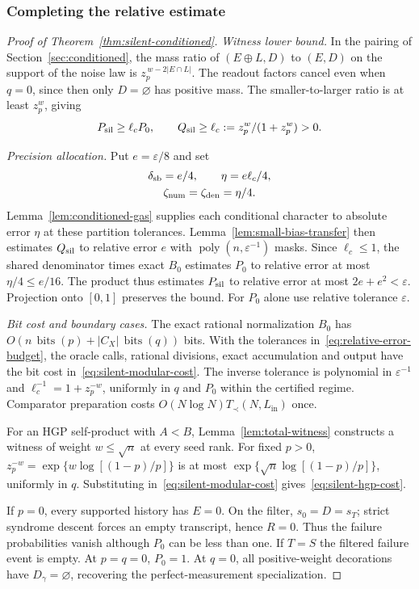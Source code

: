 \documentclass[10pt,twocolumn]{article}
\theoremstyle{definition}
\DeclareMathOperator{\poly}{poly}
\newcommand{\Lin}{L_{\mathrm{in}}}
\newcommand{\Tprec}{T_{\prec}}
\begin{document}
\subsubsection{Completing the relative estimate}\label{sec:main-proof}
\begin{proof}[Proof of Theorem~\ref{thm:silent-conditioned}]
\emph{Witness lower bound.} In the pairing of Section~\ref{sec:conditioned},
the mass ratio of $(E\oplus L,D)$ to $(E,D)$ on the support of the
noise law is $z_p^{\,w-2|E\cap L|}$. The readout factors cancel even
when $q=0$, since then only $D=\varnothing$ has positive mass.
The smaller-to-larger ratio is at least $z_p^w$, giving
\begin{equation}\label{eq:conditional-witness}
 P_{\rm sil}\ge\ell_c P_0,\qquad
 Q_{\rm sil}\ge\ell_c:=z_p^w/(1+z_p^w)>0.
\end{equation}

\emph{Precision allocation.} Put $e=\varepsilon/8$ and set
\begin{equation}\label{eq:relative-error-budget}
\begin{gathered}
 \delta_{\rm sb}=e/4,\qquad \eta=e\ell_c/4,\\
 \zeta_{\rm num}=\zeta_{\rm den}=\eta/4 .
\end{gathered}
\end{equation}
Lemma~\ref{lem:conditioned-gas} supplies each conditional character to
absolute error $\eta$ at these partition tolerances.
Lemma~\ref{lem:small-bias-transfer} then estimates $Q_{\rm sil}$ to
relative error $e$ with $\poly(n,\varepsilon^{-1})$ masks.
Since $\ell_c\le1$, the shared denominator times exact $B_0$ estimates
$P_0$ to relative error at most $\eta/4\le e/16$. The product thus
estimates $P_{\rm sil}$ to relative error at most $2e+e^2<\varepsilon$.
Projection onto $[0,1]$ preserves the bound.
For $P_0$ alone use relative tolerance $\varepsilon$.

\emph{Bit cost and boundary cases.} The exact rational normalization
$B_0$ has $O(n\,\operatorname{bits}(p)+|C_X|\,\operatorname{bits}(q))$
bits.
With the tolerances in~\eqref{eq:relative-error-budget}, the oracle
calls, rational divisions, exact accumulation and output have the bit
cost in~\eqref{eq:silent-modular-cost}. The inverse tolerance is
polynomial in $\varepsilon^{-1}$ and $\ell_c^{-1}=1+z_p^{-w}$,
uniformly in $q$ and $P_0$ within the certified regime.
Comparator preparation costs
$O(N\log N)\Tprec(N,\Lin)$ once.

For an HGP self-product with $A<B$, Lemma~\ref{lem:total-witness}
constructs a witness of weight $w\le\sqrt n$ at every seed rank.
For fixed $p>0$, $z_p^{-w}=\exp\{w\log[(1-p)/p]\}$ is at most
$\exp\{\sqrt n\log[(1-p)/p]\}$, uniformly in $q$.
Substituting in~\eqref{eq:silent-modular-cost} gives~\eqref{eq:silent-hgp-cost}.

If $p=0$, every supported history has $E=0$. On the filter,
$s_0=D=s_T$; strict syndrome descent forces an empty transcript, hence
$R=0$. Thus the failure probabilities vanish although $P_0$ can be
less than one. If $T=S$ the filtered failure event is empty. At
$p=q=0$, $P_0=1$. At $q=0$, all positive-weight decorations have
$D_\gamma=\varnothing$, recovering the perfect-measurement specialization.
\end{proof}
\end{document}
